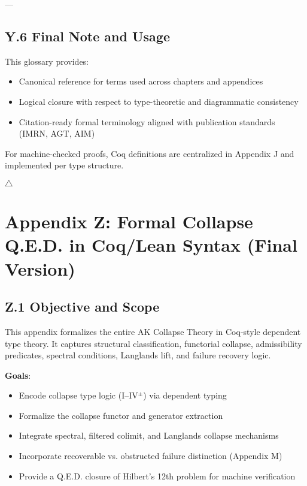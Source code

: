 \documentclass[11pt]{article}
\begin{document}
---

\subsection*{Y.6 Final Note and Usage}

This glossary provides:

\begin{itemize}
  \item Canonical reference for terms used across chapters and appendices
  \item Logical closure with respect to type-theoretic and diagrammatic consistency
  \item Citation-ready formal terminology aligned with publication standards (IMRN, AGT, AIM)
\end{itemize}

For machine-checked proofs, Coq definitions are centralized in Appendix J and implemented per type structure.

\hfill $\triangle$



\appendix
\section*{Appendix Z: Formal Collapse Q.E.D. in Coq/Lean Syntax (Final Version)}

\subsection*{Z.1 Objective and Scope}

This appendix formalizes the entire AK Collapse Theory in Coq-style dependent type theory.  
It captures structural classification, functorial collapse, admissibility predicates, spectral conditions, Langlands lift, and failure recovery logic.

\textbf{Goals}:
\begin{itemize}
  \item Encode collapse type logic (I–IV\(^{\pm}\)) via dependent typing
  \item Formalize the collapse functor and generator extraction
  \item Integrate spectral, filtered colimit, and Langlands collapse mechanisms
  \item Incorporate recoverable vs. obstructed failure distinction (Appendix M)
  \item Provide a Q.E.D. closure of Hilbert’s 12th problem for machine verification
\end{itemize}
\end{document}
